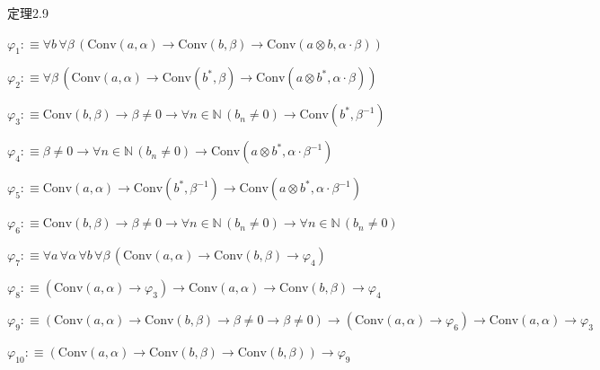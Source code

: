 \begin{fullproof}{定理2.9}
\begin{ptree}
\noLine
{}
\end{ptree}
\begin{abbrevlist}
\item $\varphi_{1} :\equiv \forall b\,\forall \beta\,(\mathrm{Conv}(a,\alpha) \to \mathrm{Conv}(b,\beta) \to \mathrm{Conv}(a \otimes b,\alpha \cdot \beta))$
\item $\varphi_{2} :\equiv \forall \beta\,(\mathrm{Conv}(a,\alpha) \to \mathrm{Conv}(b^{\ast},\beta) \to \mathrm{Conv}(a \otimes b^{\ast},\alpha \cdot \beta))$
\item $\varphi_{3} :\equiv \mathrm{Conv}(b,\beta) \to \beta \neq 0 \to \forall n \in \mathbb{N}\,(b_{n} \neq 0) \to \mathrm{Conv}(b^{\ast},\beta^{-1})$
\item $\varphi_{4} :\equiv \beta \neq 0 \to \forall n \in \mathbb{N}\,(b_{n} \neq 0) \to \mathrm{Conv}(a \otimes b^{\ast},\alpha \cdot \beta^{-1})$
\item $\varphi_{5} :\equiv \mathrm{Conv}(a,\alpha) \to \mathrm{Conv}(b^{\ast},\beta^{-1}) \to \mathrm{Conv}(a \otimes b^{\ast},\alpha \cdot \beta^{-1})$
\item $\varphi_{6} :\equiv \mathrm{Conv}(b,\beta) \to \beta \neq 0 \to \forall n \in \mathbb{N}\,(b_{n} \neq 0) \to \forall n \in \mathbb{N}\,(b_{n} \neq 0)$
\item $\varphi_{7} :\equiv \forall a\,\forall \alpha\,\forall b\,\forall \beta\,(\mathrm{Conv}(a,\alpha) \to \mathrm{Conv}(b,\beta) \to \varphi_{4})$
\item $\varphi_{8} :\equiv (\mathrm{Conv}(a,\alpha) \to \varphi_{3}) \to \mathrm{Conv}(a,\alpha) \to \mathrm{Conv}(b,\beta) \to \varphi_{4}$
\item $\varphi_{9} :\equiv (\mathrm{Conv}(a,\alpha) \to \mathrm{Conv}(b,\beta) \to \beta \neq 0 \to \beta \neq 0) \to (\mathrm{Conv}(a,\alpha) \to \varphi_{6}) \to \mathrm{Conv}(a,\alpha) \to \varphi_{3}$
\item $\varphi_{10} :\equiv (\mathrm{Conv}(a,\alpha) \to \mathrm{Conv}(b,\beta) \to \mathrm{Conv}(b,\beta)) \to \varphi_{9}$
\end{abbrevlist}
\end{fullproof}
